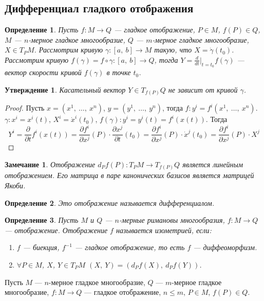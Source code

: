 \documentclass[12pt]{article}
\theoremstyle{plain}
\newtheorem{subtheorem}{Утверждение}[section]
\newtheorem{definition}{Определение}[section]
\newtheorem{remark}{Замечание}
\begin{document}
    \subsection{Дифференциал гладкого отображения}
    \begin{definition}
        Пусть $f:M\to Q$ --- гладкое отображение, $P\in M$, $f(P)\in Q$, $M$ --- $n$-мерное гладкое многообразие, $Q$ --- $m$-мерное гладкое многообразие, $X\in T_PM$. Рассмотрим кривую $\gamma:[a, \ b]\to M$ такую, что $X=\dot{\gamma}(t_0)$. Рассмотрим кривую $f(\gamma)=f\circ\gamma:[a, \ b]\to Q$, тогда $Y=\frac{d}{dt}|_{t=t_0}f(\gamma)$ --- вектор скорости кривой $f(\gamma)$ в точке $t_0$.
    \end{definition}
    \begin{subtheorem}
        Касательный вектор $Y\in T_{f(P)}Q$ не зависит от кривой $\gamma$.
    \end{subtheorem}
    \begin{proof}
        Пусть $x=(x^1, \ \ldots, \ x^n)$, $y=(y^1, \ \ldots, \ y^n)$, тогда $f:y^i=f^i(x^1, \ \ldots, \ x^n)$. $\gamma:x^i=x^i(t)$, $X^i=\dot{x}^i(t_0)$, $f(\gamma):y^i=y^i(t)=f^i(x(t))$. Тогда $$Y^i=\frac{\partial}{\partial t}f^i(x(t))=\frac{\partial f^i}{\partial x^j}(P)\cdot\frac{\partial x^j}{\partial t}(t_0)=\frac{\partial f^i}{\partial x^j}(P)\cdot\dot{x}^j(t_0)=\frac{\partial f^i}{\partial x^j}(P)\cdot X^j$$
    \end{proof}
    \begin{remark}
        Отображение $d_Pf(P):T_PM\to T_{f(P)}Q$ является линейным отображением. Его матрица в паре канонических базисов является матрицей Якоби.
    \end{remark}
    \begin{definition}
        Это отображение называется дифференциалом.
    \end{definition}
    \begin{definition}
        Пусть $M$ и $Q$ --- $n$-мерные римановы многообразия, $f:M\to Q$ --- отображение. Отображение $f$ называется изометрией, если:
        \begin{enumerate}
            \item $f$ --- биекция, $f^{-1}$ --- гладкое отображение, то есть $f$ --- диффеоморфизм.
            \item $\forall P\in M$, $X$, $Y\in T_PM$ $(X, \ Y)=(d_Pf(X), \ d_Pf(Y))$.
        \end{enumerate}
    \end{definition}
    Пусть $M$ --- $n$-мерное гладкое многообразие, $Q$ --- $m$-мерное гладкое многообразие, $f:M\to Q$ --- гладкое отображение, $n\leqslant m$, $P\in M$, $f(P)\in Q$.
\end{document}
